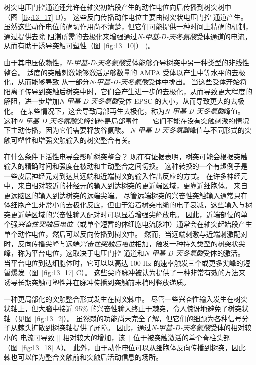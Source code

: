 树突电压门控通道还允许在轴突初始段产生的动作电位向后传播到树突树中（图~\ref{fig:13_17} B）。
这些反向传播动作电位主要由树突状电压门控  通道产生。
虽然这些动作电位的确切作用尚不清楚，但它们可能提供一种时间上精确的机制，通过提供去除  阻滞所需的去极化来增强通过\textit{N-甲基-D-天冬氨酸}受体通道的电流，从而有助于诱导突触可塑性（图~\ref{fig:13_10}） )。


由于其电压依赖性，\textit{N-甲基-D-天冬氨酸}受体能够介导树突中另一种类型的非线性整合。
适度的突触刺激能够激活足够数量的 AMPA 受体以产生中等水平的去极化，从而能够导致  从一部分\textit{N-甲基-D-天冬氨酸}受体中排出。
当这些受体开始将阳离子传导到突触后树突中时，它们会产生进一步的去极化，从而导致更大程度的  解阻，进一步增加\textit{N-甲基-D-天冬氨酸}受体 EPSC 的大小，从而导致更大的去极化。
在某些情况下，这会导致局部再生去极化，称为\textit{N-甲基-D-天冬氨酸}峰值。
这种\textit{N-甲基-D-天冬氨酸}尖峰纯粹是局部事件——它们不能在没有突触刺激的情况下主动传播，因为它们需要释放谷氨酸。
\textit{N-甲基-D-天冬氨酸}峰值与不同形式的突触可塑性和增强突触输入的树突整合有关。


在什么条件下活性电导会影响树突整合？
现在有证据表明，树突可能会根据突触输入的精确时间和强度在被动和主动整合之间切换。
这种转换的一个有趣例子是一些皮层神经元对到达其远端和近端树突的输入作出反应的方式。
在许多神经元中，来自相对较近的神经元的输入到达树突的更近端区域，更靠近细胞体。
来自更远脑区的输入到达树突的远端尖端。
尽管远端树突的兴奋性突触输入通常只在体细胞产生非常小的去极化反应，但由于沿着树突电缆的电子衰减，这些输入与树突更近端区域的兴奋性输入配对时可以显着增强尖峰放电。
因此，近端部位的单个强\textit{兴奋性突触后电位}（或单个短暂的体细胞电流脉冲）通常会在轴突起始段产生单个动作电位，然后可以反向传播到树突中。
然而，当远端刺激与近端刺激配对时，反向传播尖峰与远端\textit{兴奋性突触后电位}相加，触发一种持久类型的树突状尖峰，称为平台电位，这取决于电压门控  通道和\textit{N-甲基-D-天冬氨酸}受体的激活。
当平台电位到达细胞体时，它可以以高达 100 Hz 的速率触发三个或更多尖峰的短暂爆发（图~\ref{fig:13_17} C）。
这些尖峰脉冲被认为提供了一种非常有效的方法来诱导长期突触可塑性并在脉冲传播到突触前末梢时释放递质。


一种更局部化的突触整合形式发生在树突棘中。
尽管一些兴奋性输入发生在树突状轴上，但大脑中接近 95\% 的兴奋性输入终止于棘突，令人惊讶地避免了树突状轴（见图~\ref{fig:13_2}）。
虽然棘的功能尚未完全了解，但它们的细颈为各种信号分子从棘头扩散到树突轴提供了屏障。
因此，通过\textit{N-甲基-D-天冬氨酸}受体的相对较小的  电流可导致 [] 相对较大的增加，该 [] 位于被突触激活的单个脊柱头部（图~\ref{fig:13_18} A）。
此外，由于动作电位可以从细胞体反向传播到树突，因此棘也可以作为整合突触前和突触后活动信息的场所。


